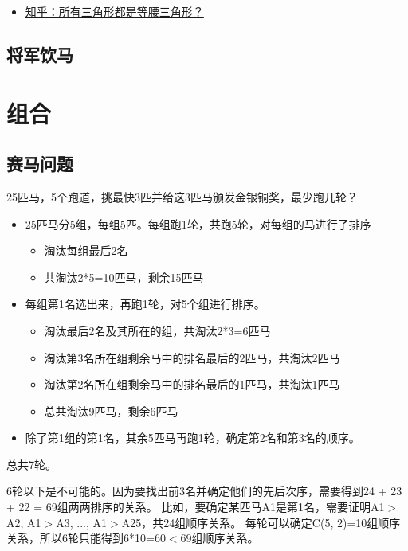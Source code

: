 \documentclass[12pt, letterpaper]{ctexrep}
\begin{document}
\begin{itemize}
\item{ \href{https://www.zhihu.com/question/34781603/answer/59948789}{知乎：所有三角形都是等腰三角形？} }
\end{itemize}



\section{将军饮马}




\chapter{组合}


\section{赛马问题}
25匹马，5个跑道，挑最快3匹并给这3匹马颁发金银铜奖，最少跑几轮？


\begin{itemize}
\item{ 25匹马分5组，每组5匹。每组跑1轮，共跑5轮，对每组的马进行了排序
\begin{itemize}
\item{ 淘汰每组最后2名 }
\item{ 共淘汰2*5=10匹马，剩余15匹马 }
\end{itemize}
 }
\item{ 每组第1名选出来，再跑1轮，对5个组进行排序。
\begin{itemize}
\item{ 淘汰最后2名及其所在的组，共淘汰2*3=6匹马 }
\item{ 淘汰第3名所在组剩余马中的排名最后的2匹马，共淘汰2匹马 }
\item{ 淘汰第2名所在组剩余马中的排名最后的1匹马，共淘汰1匹马 }
\item{ 总共淘汰9匹马，剩余6匹马 }
\end{itemize}
 }
\item{ 除了第1组的第1名，其余5匹马再跑1轮，确定第2名和第3名的顺序。 }
\end{itemize}


总共7轮。

6轮以下是不可能的。因为要找出前3名并确定他们的先后次序，需要得到24 + 23 + 22 = 69组两两排序的关系。
比如，要确定某匹马A1是第1名，需要证明A1$>$A2, A1$>$A3, ..., A1$>$A25，共24组顺序关系。
每轮可以确定C(5, 2)=10组顺序关系，所以6轮只能得到6*10=60$<$69组顺序关系。
\end{document}
